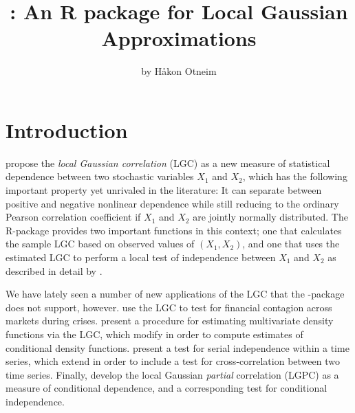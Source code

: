 \title{: An R package for Local Gaussian Approximations}
\author{by H{\aa}kon Otneim}

\maketitle


\section{Introduction}
\label{chap:introduction}

\cite{tjos:huft:2013} propose the \emph{local Gaussian correlation} (LGC) as a new measure of statistical dependence between two stochastic variables $X_1$ and $X_2$, which has the following important property yet unrivaled in the literature: It can separate between positive and negative nonlinear dependence while still reducing to the ordinary Pearson correlation coefficient if $X_1$ and $X_2$ are jointly normally distributed. The R-package  \citep{bere:klep:tjos:2014} provides two important functions in this context; one that calculates the sample LGC based on observed values of $\left(X_1,X_2\right)$, and one that uses the estimated LGC to perform a local test of independence between $X_1$ and $X_2$ as described in detail by \cite{bere:tjos:2014}.  

We have lately seen a number of new applications of the LGC that the -package does not support, however. \cite{stov:tjos:huft:2014} use the LGC to test for financial contagion across markets during crises. \cite{otne:tjos:2017} present a procedure for estimating multivariate density functions via the LGC, which \cite{otne:tjos:2018} modify in order to compute estimates of conditional density functions. \cite{laca:tjos:2017} present a test for serial independence within a time series, which \cite{laca:tjos:2018} extend in order to include a test for cross-correlation between two time series. Finally, \cite{otne:tjos:2019} develop the local Gaussian \emph{partial} correlation (LGPC) as a measure of conditional dependence, and a corresponding test for conditional independence. 


